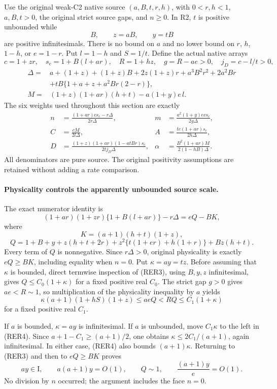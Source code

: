 Use the original weak-C2 native source $(a,B,t,r,h)$, with
$0<r,h<1$, $a,B,t>0$, the original strict source gaps, and $n\geq0$.
In R2, $t$ is positive unbounded while
\[
 B,\qquad z=aB,\qquad y=tB
\]
are positive infinitesimals.  There is no bound on $a$ and no lower
bound on $r$, $h$, $1-h$, or $e=1-r$.  Put $l=1-h$ and $S=1/t$.
Define the actual native arrays
\[
 c=1+zr,\quad s_c=1+B(l+ar),\quad
 R=1+hz,\quad g=R-ae>0,\quad j_D=c-l/t>0,
\]
\begin{align*}
 \Delta={}&a+(1+z)+(1+z)B+2z(1+z)r
          +a^3B^2r^2+2a^2Br\\
          &+tB\{1+a+z+a^2Br(2-r)\},\\
 M={}&(1+z)(1+ar)(h+t)-a(1+y)e\,l.
\end{align*}
The six weights used throughout this section are exactly
\[
\begin{aligned}
 n&=\frac{(1+ar)c s_c-r\Delta}{2r\Delta},&
 m&=\frac{a^2(1+y)e c s_c}{2g\Delta},\\
 C&=\frac{cM}{2l\Delta},&
 A&=\frac{tc(1+ar)s_c}{2h\Delta},\\
 D&=\frac{(1+z)(1+ar)(1-atBr)s_c}{2t j_D\Delta},&
 \alpha&=\frac{B^2(1+ar)M}{2(1-hB)\Delta}.
\end{aligned}                                                     \tag{RER1}
\]
All denominators are pure source.  The original positivity assumptions
are retained without adding a rate comparison.

\paragraph{Physicality controls the apparently unbounded source scale.}
The exact numerator identity is
\[
 (1+ar)(1+zr)\{1+B(l+ar)\}-r\Delta=eQ-BK,                \tag{RER2}
\]
where
\[
 K=(a+1)(h+t)(1+z),
\]
\[
 Q=1+B+y+z(h+t+2r)
       +z^2\{t(1+er)+h(1+r)\}+Bz(h+t).                 \tag{RER3}
\]
Every term of $Q$ is nonnegative.  Since $r\Delta>0$, original
physicality is exactly $eQ\geq BK$, including equality when $n=0$.
Put $\kappa=ay=tz$.  Before assuming that $\kappa$ is bounded, direct
termwise inspection of (RER3), using $B,y,z$ infinitesimal, gives
$Q\leq C_0(1+\kappa)$ for a fixed positive real $C_0$.
The strict gap $g>0$ gives $ae<R\sim1$, so multiplication of the
physicality inequality by $a$ yields
\[
 \kappa(a+1)(1+hS)(1+z)\leq aeQ<RQ
                                      \leq C_1(1+\kappa)           \tag{RER4}
\]
for a fixed positive real $C_1$.

If $a$ is bounded, $\kappa=ay$ is infinitesimal.  If $a$ is unbounded,
move $C_1\kappa$ to the left in (RER4).  Since
$a+1-C_1\geq(a+1)/2$, one obtains
$\kappa\leq2C_1/(a+1)$, again infinitesimal.  In either case,
(RER4) also bounds $(a+1)\kappa$.  Returning to (RER3) and then to
$eQ\geq BK$ proves
\[
 ay\in\mathrm I,\qquad a(a+1)y=O(1),\qquad Q\sim1,
 \qquad \frac{(a+1)y}{e}=O(1).                         \tag{RER5}
\]
No division by $n$ occurred; the argument includes the face $n=0$.

